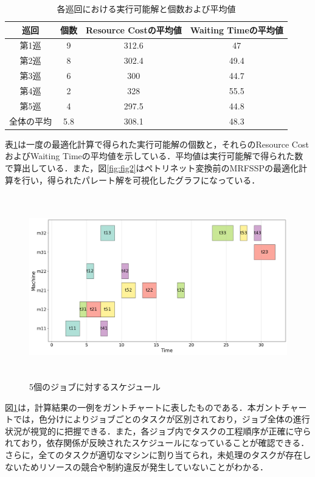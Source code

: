 \begin{table}[ht]
    \centering
    \vspace{-0.3cm}
    \caption{各巡回における実行可能解と個数および平均値}
    \begin{tabular}{|c|c|c|c|}
        \hline
         巡回 & 個数 & Resource Costの平均値 & Waiting Timeの平均値 \\
        \hline
        第1巡 & 9 & 312.6 & 47 \\
        \hline
        第2巡 & 8 & 302.4 & 49.4 \\
        \hline
        第3巡 & 6 & 300 & 44.7\\
        \hline
        第4巡 & 2 & 328 & 55.5 \\
        \hline
        第5巡 & 4 & 297.5 & 44.8 \\
        \hline
        全体の平均 & 5.8 & 308.1 & 48.3 \\
        \hline
    \end{tabular}
    \label{tab:before_feasible}
\end{table}

表\ref{tab:before_feasible}は一度の最適化計算で得られた実行可能解の個数と，それらのResource CostおよびWaiting Timeの平均値を示している．平均値は実行可能解で得られた数で算出している．また，図\ref{fig:fig2}はペトリネット変換前のMRFSSPの最適化計算を行い，得られたパレート解を可視化したグラフになっている．

\begin{figure}[H]
    \centering
    \includegraphics[width=0.8\linewidth, height=8cm]{./images/gantt1_job5.png}
    \caption{5個のジョブに対するスケジュール}
    \label{fig:fig3}
\end{figure}

図\ref{fig:fig3}は，計算結果の一例をガントチャートに表したものである．本ガントチャートでは，色分けによりジョブごとのタスクが区別されており，ジョブ全体の進行状況が視覚的に把握できる．また，各ジョブ内でタスクの工程順序が正確に守られており，依存関係が反映されたスケジュールになっていることが確認できる．さらに，全てのタスクが適切なマシンに割り当てられ，未処理のタスクが存在しないためリソースの競合や制約違反が発生していないことがわかる．

